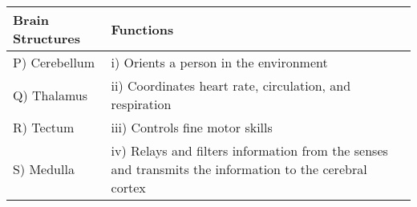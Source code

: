  \begin{tabular}{|l|p{7cm}|}
        \hline
        \textbf{Brain Structures} & \textbf{Functions} \\
        \hline
        P) Cerebellum & i) Orients a person in the environment \\
        Q) Thalamus & ii) Coordinates heart rate, circulation, and respiration \\
        R) Tectum & iii) Controls fine motor skills \\
        S) Medulla & iv) Relays and filters information from the senses and transmits the information to the cerebral cortex \\
        \hline
    \end{tabular}

